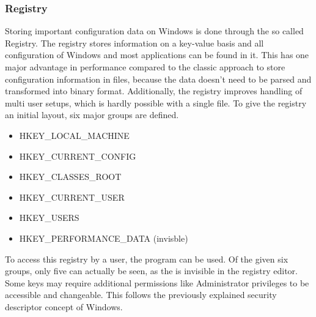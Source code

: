 \subsubsection{Registry}
Storing important configuration data on Windows is done through the so called Registry. The registry stores information on a key-value basis and all configuration of Windows and most applications can be found in it. This has one major advantage in performance compared to the classic approach to store configuration information in  files, because the data doesn't need to be parsed and transformed into binary format. Additionally, the registry improves handling of multi user setups, which is hardly possible with a single  file. To give the registry an initial layout, six major groups are defined.
\begin{itemize}
\item HKEY\_LOCAL\_MACHINE
\item HKEY\_CURRENT\_CONFIG 
\item HKEY\_CLASSES\_ROOT 
\item HKEY\_CURRENT\_USER 
\item HKEY\_USERS
\item HKEY\_PERFORMANCE\_DATA (invisble)
\end{itemize}
To access this registry by a user, the  program can be used. Of the given six groups, only five can actually be seen, as the  is invisible in the registry editor. Some keys may require additional permissions like Administrator privileges to be accessible and changeable. This follows the previously explained security descriptor concept of Windows.